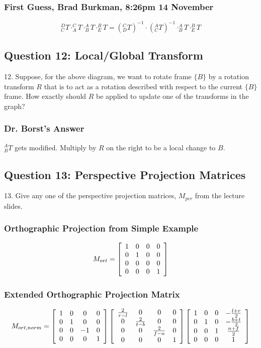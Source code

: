 \documentclass[11pt]{article}
\begin{document}
\begin{spacing}{1.2}
\subsubsection{First Guess, Brad Burkman, 8:26pm 14 November}

$$
	^D_CT \cdot 
	^C_AT \cdot 
	^A_BT \cdot 
	^B_ET = 
	\left( ^C_DT \right)^{-1} \cdot
	\left( ^A_CT \right)^{-1} \cdot
	^A_BT \cdot 
	^B_ET
	$$

\subsection{Question 12:  Local/Global Transform}
12.  Suppose, for the above diagram, we want to rotate frame $\{B\}$ by a rotation transform $R$ that is to act as a rotation described with respect to the  current $\{B\}$ frame.  How exactly should $R$ be applied to update one of the transforms in the graph?

\subsubsection{Dr. Borst's Answer}

$^A_BT$ gets modified.  Multiply by $R$ on the right to be a local change to $B$.  

\subsection{Question 13:  Perspective Projection Matrices}
13.  Give any one of the perspective projection matrices, $M_{per}$ from the lecture slides.  

\subsubsection{Orthographic Projection from Simple Example}

$$M_{ort} = 
\left[
	\begin{array}{cccc}
		1 & 0 & 0 & 0 \cr
		0 & 1 & 0 & 0 \cr
		0 & 0 & 0 & 0 \cr
		0 & 0 & 0 & 1 \cr
	\end{array}
\right]
$$

\subsubsection{Extended Orthographic Projection Matrix}

$$M_{ort,norm} = 
\left[
	\begin{array}{cccc}
		1 & 0 & 0 & 0 \cr
		0 & 1 & 0 & 0 \cr
		0 & 0 & -1 & 0 \cr
		0 & 0 & 0 & 1 \cr
	\end{array}
\right]
\left[
	\begin{array}{cccc}
		\frac{2}{r-l} & 0 & 0 & 0 \cr
		0 & \frac{2}{t-b} & 0 & 0 \cr
		0 & 0 & \frac{2}{f-n} & 0 \cr
		0 & 0 & 0 & 1 \cr
	\end{array}
\right]
\left[
	\begin{array}{cccc}
		1 & 0 & 0  & -\frac{l+r}{2} \cr
		0 & 1 & 0 & -\frac{b+t}{2} \cr
		0 & 0 & 1 & \frac{n+f}{2} \cr
		0 & 0 & 0 & 1 \cr
	\end{array}
\right]
$$


\end{spacing}
\end{document}
